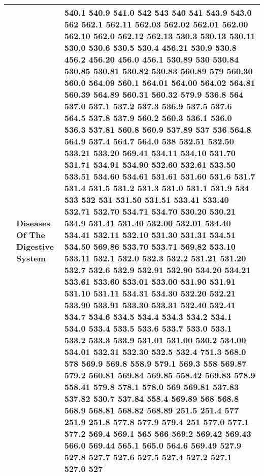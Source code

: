 \begin{longtable}{|L{.1in}|L{.6in}||L{5.65in}|}
    & Diseases Of The Digestive System &  540.1 540.9 541.0 542 543 540 541 543.9 543.0 562 562.1 562.11 562.03 562.02 562.01 562.00 562.10 562.0 562.12 562.13 530.3 530.13 530.11 530.0 530.6 530.5 530.4 456.21 530.9 530.8 456.2 456.20 456.0 456.1 530.89 530 530.84 530.85 530.81 530.82 530.83 560.89 579 560.30 560.0 564.09 560.1 564.01 564.00 564.02 564.81 560.39 564.89 560.31 560.32 579.9 536.8 564 537.0 537.1 537.2 537.3 536.9 537.5 537.6 564.5 537.8 537.9 560.2 560.3 536.1 536.0 536.3 537.81 560.8 560.9 537.89 537 536 564.8 564.9 537.4 564.7 564.0 538 532.51 532.50 533.21 533.20 569.41 534.11 534.10 531.70 531.71 534.91 534.90 532.60 532.61 533.50 533.51 534.60 534.61 531.61 531.60 531.6 531.7 531.4 531.5 531.2 531.3 531.0 531.1 531.9 534 533 532 531 531.50 531.51 533.41 533.40 532.71 532.70 534.71 534.70 530.20 530.21 534.9 531.41 531.40 532.00 532.01 534.40 534.41 532.11 532.10 531.30 531.31 534.51 534.50 569.86 533.70 533.71 569.82 533.10 533.11 532.1 532.0 532.3 532.2 531.21 531.20 532.7 532.6 532.9 532.91 532.90 534.20 534.21 533.61 533.60 533.01 533.00 531.90 531.91 531.10 531.11 534.31 534.30 532.20 532.21 533.90 533.91 533.30 533.31 532.40 532.41 534.7 534.6 534.5 534.4 534.3 534.2 534.1 534.0 533.4 533.5 533.6 533.7 533.0 533.1 533.2 533.3 533.9 531.01 531.00 530.2 534.00 534.01 532.31 532.30 532.5 532.4 751.3 568.0 578 569.9 569.8 558.9 579.1 569.3 558 569.87 579.2 560.81 569.84 569.85 558.42 569.83 578.9 558.41 579.8 578.1 578.0 569 569.81 537.83 537.82 530.7 537.84 558.4 569.89 568 568.8 568.9 568.81 568.82 568.89 251.5 251.4 577 251.9 251.8 577.8 577.9 579.4 251 577.0 577.1 577.2 569.4 569.1 565 566 569.2 569.42 569.43 566.0 569.44 565.1 565.0 564.6 569.49 527.9 527.8 527.7 527.6 527.5 527.4 527.2 527.1 527.0 527\\\hline

\end{longtable}
